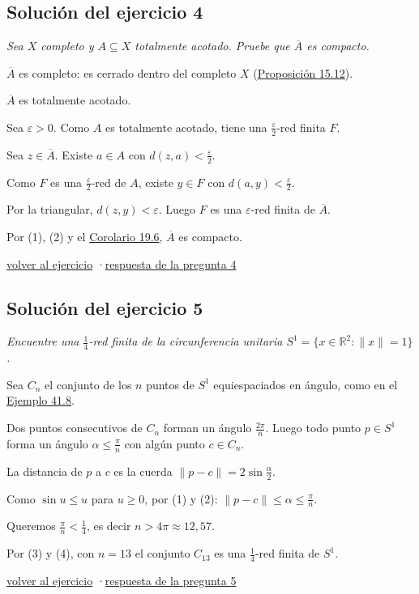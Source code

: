 \documentclass[11pt,a4paper]{article}
\newcommand{\R}{\mathbb{R}}\newcommand{\N}{\mathbb{N}}\newcommand{\Q}{\mathbb{Q}}
\newcommand{\cl}[1]{\overline{#1}}\newcommand{\norm}[1]{\lVert #1\rVert}\newcommand{\abs}[1]{\lvert #1\rvert}
\providecommand{\lt}{<}\providecommand{\gt}{>}
\begin{document}
\subsection*{\hypertarget{s-4}{}Solución del ejercicio 4}
\emph{Sea $X$ completo y $A\subseteq X$ totalmente acotado. Pruebe que $\cl A$ es compacto.}
\begin{pasos}
\item[(1)] $\cl A$ es completo: es cerrado dentro del completo $X$ (\href{https://decostruttivismo.github.io/MAT2514-repaso/pdf/MAT2514_apuntes_completos.pdf\#nameddest=teorema.15.12}{Proposición 15.12}).
\item[(2)] $\cl A$ es totalmente acotado.
\begin{subpasos}
\item Sea $\varepsilon\gt 0$. Como $A$ es totalmente acotado, tiene una $\frac\varepsilon2$-red finita $F$.
\item Sea $z\in\cl A$. Existe $a\in A$ con $d(z,a)\lt \frac\varepsilon2$.
\item Como $F$ es una $\frac\varepsilon2$-red de $A$, existe $y\in F$ con $d(a,y)\lt \frac\varepsilon2$.
\item Por la triangular, $d(z,y)\lt \varepsilon$. Luego $F$ es una $\varepsilon$-red finita de $\cl A$.
\end{subpasos}
\item[] Por (1), (2) y el \href{https://decostruttivismo.github.io/MAT2514-repaso/pdf/MAT2514_apuntes_completos.pdf\#nameddest=teorema.19.6}{Corolario 19.6}, $\cl A$ es compacto.
\end{pasos}
\par{\small \hyperlink{x-4}{volver al ejercicio} \quad·\quad \hyperlink{r-4}{respuesta de la pregunta 4}}
\subsection*{\hypertarget{s-5}{}Solución del ejercicio 5}
\emph{Encuentre una $\frac14$-red finita de la circunferencia unitaria $S^1=\{x\in\R^2:\norm x=1\}$.}
\begin{pasos}
\item[] Sea $C_n$ el conjunto de los $n$ puntos de $S^1$ equiespaciados en ángulo, como en el \href{https://decostruttivismo.github.io/MAT2514-repaso/pdf/MAT2514_apuntes_completos.pdf\#nameddest=teorema.41.8}{Ejemplo 41.8}.
\item[(1)] Dos puntos consecutivos de $C_n$ forman un ángulo $\frac{2\pi}n$. Luego todo punto $p\in S^1$ forma un ángulo $\alpha\le\frac\pi n$ con algún punto $c\in C_n$.
\item[(2)] La distancia de $p$ a $c$ es la cuerda $\norm{p-c}=2\sin\frac\alpha2$.
\item[(3)] Como $\sin u\le u$ para $u\ge0$, por (1) y (2): $\norm{p-c}\le\alpha\le\frac\pi n$.
\item[(4)] Queremos $\frac\pi n\lt \frac14$, es decir $n\gt 4\pi\approx12{,}57$.
\item[] Por (3) y (4), con $n=13$ el conjunto $C_{13}$ es una $\frac14$-red finita de $S^1$.
\end{pasos}
\par{\small \hyperlink{x-5}{volver al ejercicio} \quad·\quad \hyperlink{r-5}{respuesta de la pregunta 5}}
\end{document}
